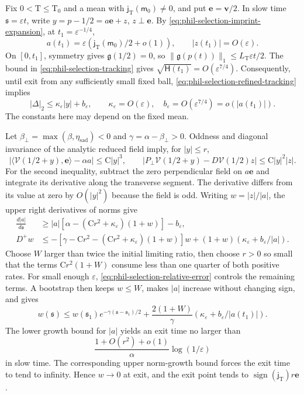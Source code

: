 Fix \(0<\mathrm T\le\mathrm T_0\) and a mean with
\(\mathsf j_{\mathrm T}(\mathsf m_0)\ne0\), and put
\(\mathbf e=\mathbf v/2\). In slow time
\(\mathfrak s=\varepsilon t\), write
\(y=p-1/2=a\mathbf e+z\), \(z\perp\mathbf e\).
By \cref{eq:phil-selection-imprint-expansion}, at
\(t_1=\varepsilon^{-1/4}\),
\[
 a(t_1)=\varepsilon(\mathsf j_{\mathrm T}(\mathsf m_0)/2+o(1)),
 \qquad |z(t_1)|=O(\varepsilon).
\]
On \([0,t_1]\), symmetry gives \(\mathfrak g(1/2)=0\), so
\(\|\mathfrak g(p(t))\|_1\le L_{\mathrm T}\varepsilon t/2\).
The bound in \cref{eq:phil-selection-tracking} gives
\(\sqrt{\mathsf H(t_1)}=O(\varepsilon^{7/4})\).
Consequently, until exit from any sufficiently small fixed ball,
\cref{eq:phil-selection-refined-tracking} implies
\begin{equation}
 |\Delta|_2\le\kappa_\varepsilon|y|+b_\varepsilon,
 \qquad \kappa_\varepsilon=O(\varepsilon),\quad
 b_\varepsilon=O(\varepsilon^{7/4})=o(|a(t_1)|).
\label{eq:phil-selection-relative-error}
\end{equation}
The constants here may depend on the fixed mean.

Let \(\beta_\perp=\max(\beta,\eta_{\mathrm{sad}})<0\) and
\(\gamma=\alpha-\beta_\perp>0\).
Oddness and diagonal invariance of the analytic reduced field imply,
for \(|y|\le r\),
\[
 |\langle\mathscr V(1/2+y),\mathbf e\rangle-\alpha a|
       \le\mathrm C|y|^3,\qquad
 |P_\perp\mathscr V(1/2+y)-D\mathscr V(1/2)z|
       \le\mathrm C|y|^2|z|.
\]
For the second inequality, subtract the zero perpendicular field on
\(a\mathbf e\) and integrate its derivative along the transverse
segment. The derivative differs from its value at zero by
\(O(|y|^2)\) because the field is odd.
Writing \(w=|z|/|a|\), the upper right derivatives of norms give
\begin{equation}
 \begin{aligned}
 \frac{d|a|}{d\mathfrak s}
 &\ge |a|[\alpha-(\mathrm Cr^2+\kappa_\varepsilon)(1+w)]
                -b_\varepsilon,\\
 D^+w
 &\le-[\gamma-\mathrm Cr^2
             -(\mathrm Cr^2+\kappa_\varepsilon)(1+w)]w
        +(1+w)(\kappa_\varepsilon+b_\varepsilon/|a|).
 \end{aligned}
\label{eq:phil-selection-cone}
\end{equation}
Choose \(W\) larger than twice the initial limiting ratio, then choose
\(r>0\) so small that the terms \(\mathrm Cr^2(1+W)\) consume less than
one quarter of both positive rates. For small enough \(\varepsilon\),
\cref{eq:phil-selection-relative-error} controls the remaining terms.
A bootstrap then keeps \(w\le W\), makes \(|a|\) increase without changing
sign, and gives
\[
 w(\mathfrak s)
 \le w(\mathfrak s_1)e^{-\gamma(\mathfrak s-\mathfrak s_1)/2}
  +\frac{2(1+W)}\gamma
       (\kappa_\varepsilon+b_\varepsilon/|a(t_1)|).
\]
The lower growth bound for \(|a|\) yields an exit time no larger than
\[
 \frac{1+O(r^2)+o(1)}\alpha\log(1/\varepsilon)
\]
in slow time. The corresponding upper norm-growth bound forces the exit
time to tend to infinity. Hence \(w\to0\) at exit, and the exit point
tends to \(\operatorname{sign}(\mathsf j_{\mathrm T})r\mathbf e\).

